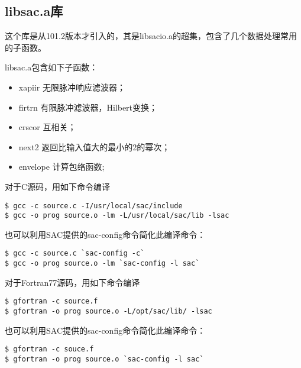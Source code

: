 \subsection{libsac.a库}
这个库是从101.2版本才引入的，其是libsacio.a的超集，包含了几个数据处理常用的子函数。

libsac.a包含如下子函数：
\begin{itemize}
\item xapiir  无限脉冲响应滤波器；
\item firtrn  有限脉冲滤波器，Hilbert变换；
\item crscor  互相关；
\item next2   返回比输入值大的最小的2的幂次；
\item envelope 计算包络函数; 
\end{itemize}

对于C源码，用如下命令编译
\begin{lstlisting}[style=Shell]
$ gcc -c source.c -I/usr/local/sac/include
$ gcc -o prog source.o -lm -L/usr/local/sac/lib -lsac
\end{lstlisting}
也可以利用SAC提供的sac-config命令简化此编译命令：
\begin{lstlisting}[style=Shell]
$ gcc -c source.c `sac-config -c`
$ gcc -o prog source.o -lm `sac-config -l sac`
\end{lstlisting}

对于Fortran77源码，用如下命令编译
\begin{lstlisting}[style=Shell]
$ gfortran -c source.f
$ gfortran -o prog source.o -L/opt/sac/lib/ -lsac
\end{lstlisting}
也可以利用SAC提供的sac-config命令简化此编译命令：
\begin{lstlisting}[style=Shell]
$ gfortran -c souce.f
$ gfortran -o prog source.o `sac-config -l sac`
\end{lstlisting}
